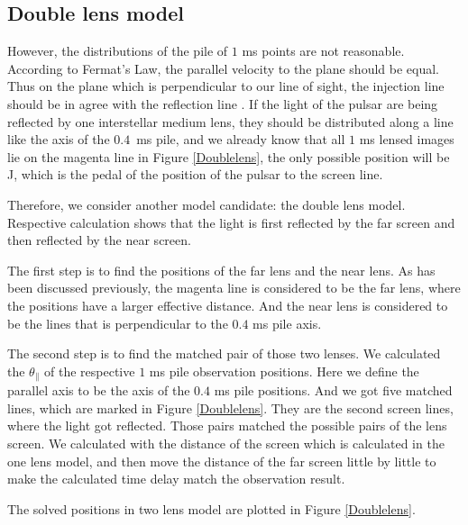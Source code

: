 \documentclass[useAMS,usenatbib]{mn2e}
\begin{document}
\subsection{Double lens model}
However, the distributions of the pile of $1$ ms points are not reasonable. According to Fermat's Law, the parallel velocity to the plane should be equal. Thus on the plane which is perpendicular to our line of sight, the injection line should be in agree with the reflection line . If the light of the pulsar are being reflected by one interstellar medium lens, they should be distributed along a line like the axis of the $0.4$\ ms pile, and we already know that all $1$ ms lensed images lie on the magenta line in Figure \ref{Doublelens}, the only possible position will be J, which is the pedal of the position of the pulsar to the screen line.

Therefore, we consider another model candidate: the double lens model. Respective calculation shows that the light is first reflected by the far screen and then reflected by the near screen. 

The first step is to find the positions of the far lens and the near lens. As has been discussed previously, the magenta line is considered to be the far lens, where the positions have a larger effective distance. And the near lens is considered to be the lines that is perpendicular to the $0.4$ ms pile axis. 

The second step is to find the matched pair of those two lenses. We calculated the $\theta_{\parallel}$ of the respective $1$ ms pile observation positions. Here we define the parallel axis to be the axis of the $0.4$ ms pile positions. And we got five matched lines, which are marked in Figure \ref{Doublelens}. They are the second screen lines, where the light got reflected. Those pairs matched the possible pairs of the lens screen. We calculated with the distance of the screen which is calculated in the one lens model, and then move the distance of the far screen little by little to make the calculated time delay match the observation result.

The solved positions in two lens model are plotted in Figure \ref{Doublelens}.  



\end{document}
